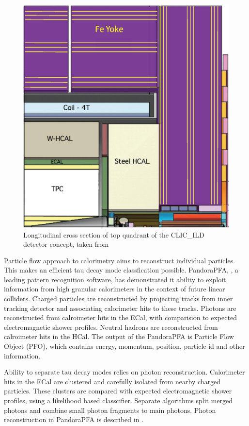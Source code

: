 \documentclass[a4paper,11pt]{article}
\begin{document}
\begin{figure}[htbp]
\centering %

\includegraphics[width=.45\textwidth]{plots/CLICILD.eps}
\qquad
\caption{\label{fig:ILD} Longitudinal cross section of top quadrant of the CLIC\_ILD detector concept, taken from \cite{Linssen:2012hp}
}
\end{figure}

Particle flow approach to calorimetry aims to reconstruct individual particles. This makes an efficient tau decay mode classfication possible. PandoraPFA, \cite{Marshall:2015rfa}, a leading pattern recognition software, has demonstrated it ability to exploit information from high granular calorimeters in the context of future linear colliders. Charged particles are reconstructed by projecting tracks from inner tracking detector and associating calorimeter hits to these tracks. Photons are reconstructed from calroimeter hits in the ECal, with comparision to expected electromagnetic shower profiles. Neutral hadrons are reconstructed from calroimeter hits in the HCal. The output of the PandoraPFA is Particle Flow Object (PFO), which contains energy, momentum, position, particle id and other information.

Ability to separate tau decay modes relies on photon reconstruction. Calorimeter hits in the ECal are clustered and carefully isolated from nearby charged particles. These clusters are compared with expected electromagnetic shower profiles, using a likelihood based classcifier. Separate algorithms split merged photons and combine small photon fragments to main photons. Photon reconstruction in PandoraPFA is described in \cite{Xu:2016rcz}.
\end{document}
